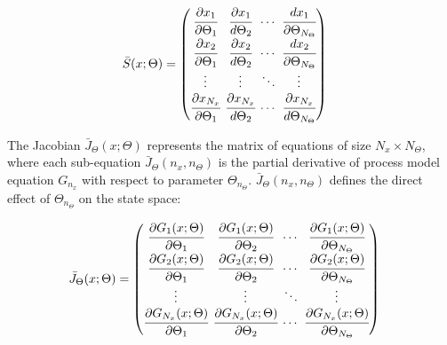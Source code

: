 \documentclass[a4paper,fleqn]{cas-dc}
\begin{document}
	{\footnotesize
		\begin{equation}
			\begin{split}
				\bar{S}(x;\Theta) & = 
				\begingroup %
				\setlength\arraycolsep{2pt}
				\begin{pmatrix}
					\cfrac{\partial {x_{1}}}{\partial {\Theta_{1}}} 	& \cfrac{\partial {x_{1}}}{d {\Theta_{2}}}     & \cdots & \cfrac{d {x_{1}}}{\partial {\Theta_{N_\Theta}}}\\
					\cfrac{\partial {x_{2}}}{\partial {\Theta_{1}}} 	& \cfrac{\partial {x_{2}}}{d {\Theta_{2}}}     & \cdots & \cfrac{d {x_{2}}}{\partial {\Theta_{N_\Theta}}}\\
					\vdots					 	    & \vdots 					   	  & \ddots & \vdots\\
					\cfrac{\partial {x_{N_x}}}{\partial {\Theta_{1}}} 	& \cfrac{\partial {x_{N_x}}}{d {\Theta_{2}}}     & \cdots & \cfrac{\partial {x_{N_x}}}{d {\Theta_{N_\Theta}}}
				\end{pmatrix} 
				\endgroup
			\end{split}
	\end{equation} }
	
	The Jacobian ${\bar{J}_\Theta}(x;\Theta)$ represents the matrix of equations of size $N_x \times N_\Theta$, where each sub-equation ${\bar{J}_\Theta}(n_x,n_\Theta)$ is the partial derivative of process model equation $G_{n_x}$ with respect to parameter $\Theta_{n_\Theta}$. ${\bar{J}_\Theta}(n_x,n_\Theta)$ defines the direct effect of $\Theta_{n_\Theta}$ on the state space:
	
	{\footnotesize
		\begin{align}
			{\bar{J}_\Theta}(x;\Theta) & =
			\begingroup %
			\setlength\arraycolsep{2pt}
			\begin{pmatrix}
				\cfrac{\partial {G_{1}}(x;\Theta)}{\partial {\Theta_{1}}} & \cfrac{\partial {G_{1}}(x;\Theta)}{\partial {\Theta_{2}}} & \cdots & \cfrac{\partial {G_{1}}(x;\Theta)}{\partial {\Theta_{N_\Theta}}}\\
				\cfrac{\partial {G_{2}}(x;\Theta)}{\partial {\Theta_{1}}} & \cfrac{\partial {G_{2}}(x;\Theta)}{\partial {\Theta_{2}}} & \cdots & \cfrac{\partial {G_{2}}(x;\Theta)}{\partial {\Theta_{N_\Theta}}}\\
				\vdots & \vdots & \ddots & \vdots\\
				\cfrac{\partial {G_{N_x}}(x;\Theta)}{\partial {\Theta_{1}}} & \cfrac{\partial {G_{N_x}}(x;\Theta)}{\partial {\Theta_{2}}} & \cdots & \cfrac{\partial {G_{N_x}}(x;\Theta)}{\partial {\Theta_{N_\Theta}}}
			\end{pmatrix}
			\endgroup
	\end{align}}
	
\end{document}
